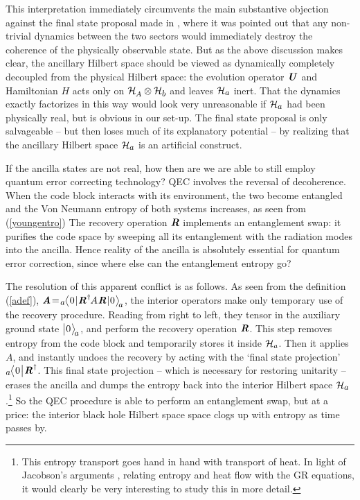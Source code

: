 \documentclass[12pt]{article}%
\def\spc{\hspace{.5pt}}
\begin{document}
This interpretation immediately circumvents the main substantive objection against the final state proposal made in \cite{preskillgottesman}, where it was pointed out that 
any non-trivial dynamics between the two sectors would immediately destroy the coherence of the physically observable state. But as
the above discussion makes clear, the ancillary Hilbert space should be viewed as dynamically completely decoupled from the physical Hilbert space:
the evolution operator $\mbox{\textit{\textbf{U}}}$ and Hamiltonian $H$ acts only on ${\cal H}_\AA \otimes {\cal H}_\bbbb$ and leaves ${\cal H}_\aaaa$ inert. 
That the dynamics exactly factorizes in this way would look very unreasonable if ${\cal H}_\aaaa$ had been physically real, but is obvious in our set-up.
The final state proposal is only salvageable --   but then loses much of its  explanatory potential -- by realizing that the ancillary Hilbert space 
${\cal H}_\aaaa$ is an artificial construct. 


If the ancilla states are not real, how then are we are able to still employ quantum error correcting technology?
QEC involves the reversal of decoherence. When the code block interacts with its environment, the two become entangled and 
the Von Neumann entropy of both systems increases, as seen from (\ref{youngentro}) The recovery operation ${\textit{\textbf{R}\!\,}}$ implements an
entanglement swap: it purifies the code space by sweeping all its entanglement with the radiation modes into the ancilla.
Hence reality of the ancilla is absolutely essential for quantum error correction, since where else can the entanglement entropy go? 

The resolution of this apparent conflict is as follows. As seen from the definition (\ref{adef}), $\textit{\textbf A} \! =\!  {}_\aaaa\nspc\la \spc 0 \spc | \smpc \rR^{\spc \dag}\nspc A\spc \rR\spc  | \spc 0\spc \ra_{\! \aaaa}$,
the interior operators make only temporary use of  the recovery procedure. Reading from right to left, they tensor in the auxiliary ground state $\bigl| \spc 0\spc \ra_{\! \aaaa}$, 
and perform the recovery operation ${\textit{\textbf{R}\!\,}}$.  This step removes entropy from the code block and temporarily stores it inside ${\cal H}_a$. Then it applies $A$,  and instantly undoes the recovery 
by acting with the `final state projection' ${}_\aaaa\nspc\la \spc 0 \spc \bigr| \smpc \rR^{\spc \dag}$. This final state projection -- which is necessary for restoring unitarity --
erases the ancilla and dumps the entropy back into the interior Hilbert space ${\cal H}_\aaaa$.\footnote{This entropy transport goes hand in hand with transport of heat.
In light of Jacobson's arguments \cite{jacobson}, relating entropy and heat flow with the GR equations, it would clearly be very interesting to study this in more detail.}
So the QEC procedure is able to perform an entanglement swap, but at a price: the
 interior black hole Hilbert space space clogs up with entropy as time passes by. 
\end{document}
